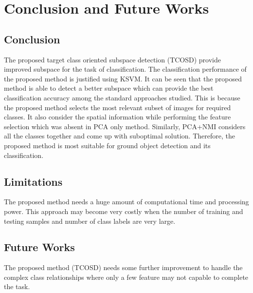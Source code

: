 \documentclass[document.tex]{subfiles}
\begin{document}
\chapter{Conclusion and Future Works}

\section{Conclusion}
\noindent The proposed target class oriented subspace detection (TCOSD) provide improved subspace for the task of classification. The classification performance of the proposed method is justified using KSVM. It can be seen that the proposed method is able to detect a better subspace which can provide the best classification accuracy among the standard approaches studied. This is because the proposed method selects the most relevant subset of images for required classes. It also consider the spatial information while performing the feature selection which was absent in PCA only method. Similarly, PCA+NMI considers all the classes together and come up with suboptimal solution. Therefore, the proposed method is most suitable for ground object detection and its classification.
\section{Limitations}
\noindent The proposed method needs a huge amount of computational time and processing power. This approach may become very costly when the number of training and testing samples and number of class labels are very large.
\section{Future Works}
The proposed method (TCOSD) needs some further improvement to handle the complex class relationships where only a few feature may not capable to complete the task.
\end{document}
